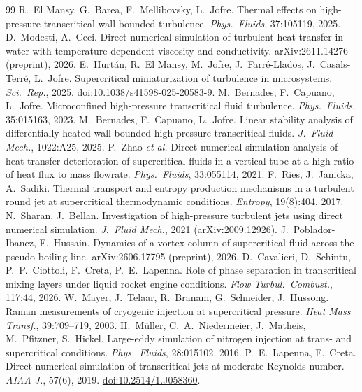 \documentclass[11pt]{article}
\begin{document}
\begin{thebibliography}{99}
 R.\ El Mansy, G.\ Barea, F.\ Mellibovsky, L.\ Jofre. Thermal effects on high-pressure transcritical wall-bounded turbulence. \emph{Phys.\ Fluids}, 37:105119, 2025.
 D.\ Modesti, A.\ Ceci. Direct numerical simulation of turbulent heat transfer in water with temperature-dependent viscosity and conductivity. arXiv:2611.14276 (preprint), 2026.
 E.\ Hurt\'an, R.\ El Mansy, M.\ Jofre, J.\ Farr\'e-Llados, J.\ Casals-Terr\'e, L.\ Jofre. Supercritical miniaturization of turbulence in microsystems. \emph{Sci.\ Rep.}, 2025. \href{https://doi.org/10.1038/s41598-025-20583-9}{doi:10.1038/s41598-025-20583-9}.
 M.\ Bernades, F.\ Capuano, L.\ Jofre. Microconfined high-pressure transcritical fluid turbulence. \emph{Phys.\ Fluids}, 35:015163, 2023.
 M.\ Bernades, F.\ Capuano, L.\ Jofre. Linear stability analysis of differentially heated wall-bounded high-pressure transcritical fluids. \emph{J.\ Fluid Mech.}, 1022:A25, 2025.
 P.\ Zhao \emph{et al.} Direct numerical simulation analysis of heat transfer deterioration of supercritical fluids in a vertical tube at a high ratio of heat flux to mass flowrate. \emph{Phys.\ Fluids}, 33:055114, 2021.
 F.\ Ries, J.\ Janicka, A.\ Sadiki. Thermal transport and entropy production mechanisms in a turbulent round jet at supercritical thermodynamic conditions. \emph{Entropy}, 19(8):404, 2017.
 N.\ Sharan, J.\ Bellan. Investigation of high-pressure turbulent jets using direct numerical simulation. \emph{J.\ Fluid Mech.}, 2021 (arXiv:2009.12926).
 J.\ Poblador-Ibanez, F.\ Hussain. Dynamics of a vortex column of supercritical fluid across the pseudo-boiling line. arXiv:2606.17795 (preprint), 2026.
 D.\ Cavalieri, D.\ Schintu, P.\ P.\ Ciottoli, F.\ Creta, P.\ E.\ Lapenna. Role of phase separation in transcritical mixing layers under liquid rocket engine conditions. \emph{Flow Turbul.\ Combust.}, 117:44, 2026.
 W.\ Mayer, J.\ Telaar, R.\ Branam, G.\ Schneider, J.\ Hussong. Raman measurements of cryogenic injection at supercritical pressure. \emph{Heat Mass Transf.}, 39:709--719, 2003.
 H.\ M\"uller, C.\ A.\ Niedermeier, J.\ Matheis, M.\ Pfitzner, S.\ Hickel. Large-eddy simulation of nitrogen injection at trans- and supercritical conditions. \emph{Phys.\ Fluids}, 28:015102, 2016.
 P.\ E.\ Lapenna, F.\ Creta. Direct numerical simulation of transcritical jets at moderate Reynolds number. \emph{AIAA J.}, 57(6), 2019. \href{https://doi.org/10.2514/1.J058360}{doi:10.2514/1.J058360}.

\end{thebibliography}
\end{document}
